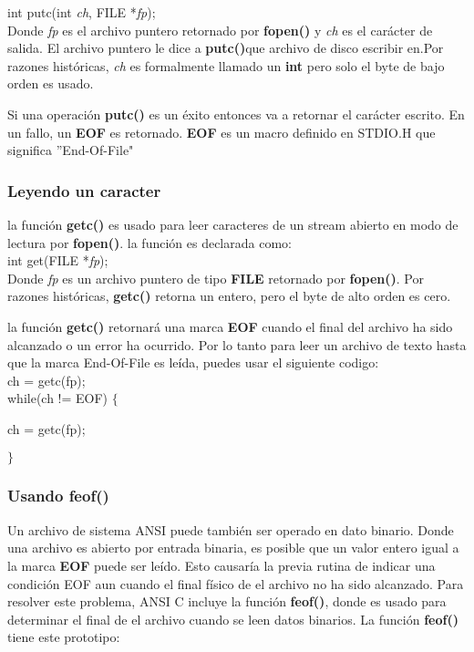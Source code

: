 \documentclass[]{article}
\begin{document}
	int putc(int \textit{ch}, FILE *\textit{fp});\\
	
	Donde \textit{fp} es el archivo puntero retornado por \textbf{fopen()} y \textit{ch} es el carácter de salida. El archivo puntero le dice a \textbf{putc()}que archivo de disco escribir en.Por razones históricas, \textit{ch} es formalmente llamado un \textbf{int} pero solo el byte de bajo orden es usado.
	
	Si una operación \textbf{putc()} es un éxito entonces va a retornar el carácter escrito. En un fallo, un \textbf{EOF} es retornado. \textbf{EOF} es un macro definido en STDIO.H que significa ''End-Of-File"
	
	\subsubsection{Leyendo un caracter}
	
	la función \textbf{getc()} es usado para leer caracteres de un stream abierto en modo de lectura por \textbf{fopen()}. la función es declarada como:\\
	
	int get(FILE *\textit{fp});\\
	
	Donde \textit{fp} es un archivo puntero de tipo \textbf{FILE} retornado por \textbf{fopen()}. Por razones históricas, \textbf{getc()} retorna un entero, pero el byte de alto orden es cero.
	
	la función \textbf{getc()} retornará una marca \textbf{EOF} cuando el final del archivo ha sido alcanzado o un error ha ocurrido. Por lo tanto para leer un archivo de texto hasta que la marca End-Of-File es leída, puedes  usar el siguiente codigo:\\
	
	ch = getc(fp);\\
	
	while(ch != EOF) $\lbrace$
	
	ch = getc(fp);
	
	$\rbrace$
	
	\subsubsection{Usando feof()}
	
	Un archivo de sistema ANSI puede también ser operado en dato binario. Donde una archivo es abierto por entrada binaria, es posible que un valor entero igual a la marca \textbf{EOF} puede ser leído. Esto causaría la previa rutina de indicar una condición EOF aun cuando el final físico de el archivo no ha sido alcanzado. Para resolver este problema, ANSI C incluye la función \textbf{feof()}, donde es usado para determinar el final de el archivo cuando se leen datos binarios. La función \textbf{feof()} tiene este prototipo:\\
	
\end{document}
